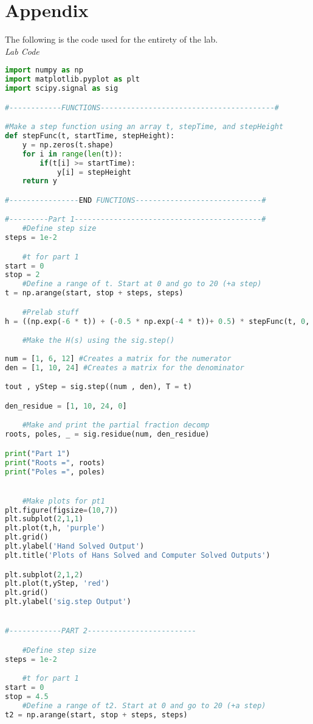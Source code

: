 \documentclass[12pt,a4paper]{article}
\begin{document}
\section{Appendix}
The following is the code used for the entirety of the lab.\\
\textit{Lab Code}
\begin{lstlisting}[language=Python]
import numpy as np
import matplotlib.pyplot as plt
import scipy.signal as sig

#------------FUNCTIONS----------------------------------------#

#Make a step function using an array t, stepTime, and stepHeight
def stepFunc(t, startTime, stepHeight):
    y = np.zeros(t.shape)
    for i in range(len(t)):
        if(t[i] >= startTime):
            y[i] = stepHeight
    return y

#----------------END FUNCTIONS-----------------------------#

#---------Part 1-------------------------------------------#
    #Define step size
steps = 1e-2

    #t for part 1
start = 0
stop = 2
    #Define a range of t. Start at 0 and go to 20 (+a step)
t = np.arange(start, stop + steps, steps)

    #Prelab stuff
h = ((np.exp(-6 * t)) + (-0.5 * np.exp(-4 * t))+ 0.5) * stepFunc(t, 0, 1)

    #Make the H(s) using the sig.step()
    
num = [1, 6, 12] #Creates a matrix for the numerator
den = [1, 10, 24] #Creates a matrix for the denominator

tout , yStep = sig.step((num , den), T = t)

den_residue = [1, 10, 24, 0]

    #Make and print the partial fraction decomp
roots, poles, _ = sig.residue(num, den_residue)

print("Part 1")
print("Roots =", roots)
print("Poles =", poles)


    #Make plots for pt1
plt.figure(figsize=(10,7))
plt.subplot(2,1,1)
plt.plot(t,h, 'purple')
plt.grid()
plt.ylabel('Hand Solved Output')
plt.title('Plots of Hans Solved and Computer Solved Outputs')

plt.subplot(2,1,2)
plt.plot(t,yStep, 'red')
plt.grid()
plt.ylabel('sig.step Output')


#------------PART 2-------------------------

    #Define step size
steps = 1e-2

    #t for part 1
start = 0
stop = 4.5
    #Define a range of t2. Start at 0 and go to 20 (+a step)
t2 = np.arange(start, stop + steps, steps)


\end{lstlisting}
\end{document}
